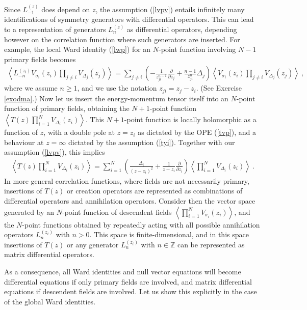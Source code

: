 \documentclass[12pt,a4paper,notitlepage]{report}
\newcommand \la {\left\langle}
\newcommand \ra {\right\rangle}
\newcommand \Z {\mathbb{Z}}
\newcommand \p {\partial}
\newcommand \pp[1] {{\frac{\p}{\p #1}}}
\numberwithin{equation}{section}
\theoremstyle{break}
\begin{document}
Since $L_{-1}^{(z)}$ does depend on $z$, the assumption (\ref{lvpv}) entails infinitely many identifications of symmetry generators with differential operators. This can lead to a representation of generators $L_n^{(z)}$ as differential operators, depending however on the correlation function where such generators are inserted. For example, the local Ward identity (\ref{lwp}) for an $N$-point function involving $N-1$ primary fields becomes
\begin{align}
 \boxed{\la L_{-n}^{(z_i)}V_{\sigma_i}(z_i)\prod_{j\neq i} V_{\Delta_j}(z_j) \ra =
\sum_{j\neq i} \left(-\frac{1}{z_{ji}^{n-1}} \pp{z_j}  + \frac{n-1}{z_{ji}^n} \Delta_j\right)
\la V_{\sigma_i}(z_i)\prod_{j\neq i} V_{\Delta_j}(z_j) \ra} \ ,
\label{lmn}
\end{align}
where we assume $n\geq 1$, and we use the notation $z_{ji}=z_j-z_i$. (See Exercise \ref{exodma}.)
Now let us insert the energy-momentum tensor itself into an $N$-point function of primary fields, obtaining the $N+1$-point function $
\la T(z) \prod_{i=1}^N V_{\Delta_i}(z_i)\ra$. This $N+1$-point function is locally holomorphic as a function of $z$, with a double pole at $z=z_i$ as dictated by the OPE (\ref{tvp}), and a behaviour at $z=\infty$ dictated by the assumption (\ref{tyi}). Together with our assumption (\ref{lvpv}), this implies 
\begin{align}
 \boxed{\la T(z) \prod_{i=1}^N V_{\Delta_i}(z_i)\ra = \sum_{i=1}^N \left(\frac{\Delta_i}{(z-z_i)^2} + \frac{1}{z-z_i}\pp{z_i}\right)\la  \prod_{i=1}^N V_{\Delta_i}(z_i)\ra }\ .
\label{dtz}
\end{align}
In more general correlation functions, where fields are not necessarily primary, insertions of $T(z)$ or creation operators are represented as combinations of differential operators and annihilation operators. Consider then the vector space generated by an $N$-point function of descendent fields $\la \prod_{i=1}^NV_{\sigma_i}(z_i)\ra$, and the $N$-point functions obtained by repeatedly acting with all possible annihilation operators $L_n^{(z_i)}$ with $n>0$. This space is finite-dimensional, and in this space insertions of $T(z)$ or 
any generator $L_n^{(z_i)}$ with $n\in \Z$ can be represented as matrix differential operators. 

As a consequence, all Ward identities and null vector equations will become differential equations if only primary fields are involved, and matrix differential equations if descendent fields are involved. Let us show this explicitly in the case of the global Ward identities.
\end{document}
